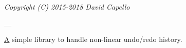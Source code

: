 {\itshape Copyright (C) 2015-\/2018 David Capello}

\href{https://github.com/dacap/undo/actions?query=workflow\%3Abuild}{\texttt{ }} \href{LICENSE.txt}{\texttt{ }}

\mbox{\hyperlink{class_a}{A}} simple library to handle non-\/linear undo/redo history. 